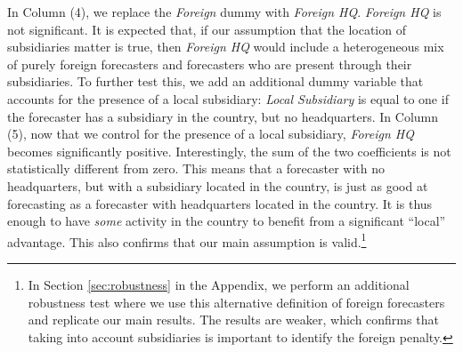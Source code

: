 In Column (4), we replace the \textit{Foreign} dummy with \textit{Foreign HQ}. \textit{Foreign HQ} is not significant. It is expected that, if our assumption that the location of subsidiaries matter is true, then \textit{Foreign HQ} would include a heterogeneous mix of purely foreign forecasters and forecasters who are present through their subsidiaries. To further test this, we add an additional dummy variable that accounts for the presence of a local subsidiary: \textit{Local Subsidiary} is equal to one if the forecaster has a subsidiary in the country, but no headquarters. In Column (5), now that we control for the presence of a local subsidiary, \textit{Foreign HQ} becomes significantly positive. Interestingly, the sum of the two coefficients is not statistically different from zero. This means that a forecaster with no headquarters, but with a subsidiary located in the country, is just as good at forecasting as a forecaster with headquarters located in the country. It is thus enough to have \emph{some} activity in the country to benefit from a significant ``local'' advantage. This also confirms that our main assumption is valid.\footnote{In Section \ref{sec:robustness} in the Appendix, we perform an additional robustness test where we use this alternative definition of foreign forecasters and replicate our main results. The results are weaker, which confirms that taking into account subsidiaries is important to identify the foreign penalty.}



